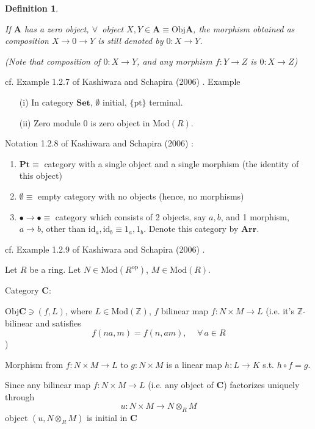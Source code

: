 \documentclass[10pt]{amsart}
\newtheorem{definition}{Definition}
\begin{document}
\begin{multicols*}{2}
\begin{definition}
\begin{enumerate}
		If $\mathbf{A}$ has a zero object, $\forall \, $ object $X, Y \in \mathbf{A} \equiv \text{Obj}\mathbf{A}$, the morphism obtained as composition $X\to 0 \to Y$ is still denoted by $0: X\to Y$.
		
		(Note that composition of $0:X \to Y$, and any morphism $f:Y \to Z$ is $0:X \to Z$)
	\end{enumerate}
\end{definition}

cf. Example 1.2.7 of Kashiwara and Schapira (2006) \cite{KaSch2006}. 
Example 
\begin{enumerate}
	\item[(i)] In category $\mathbf{Set}$, $\emptyset$ initial, $\lbrace \text{pt} \rbrace$ terminal. 
	\item[(ii)] Zero module $0$ is zero object in $\text{Mod}(R)$.
\end{enumerate}

Notation 1.2.8 of Kashiwara and Schapira (2006) \cite{KaSch2006}:
\begin{enumerate}
	\item $\mathbf{Pt} \equiv $ category with a single object and a single morphism (the identity of this object)
	\item $\emptyset \equiv $ empty category with no objects (hence, no morphisms)
	\item $\bullet \to \bullet \equiv$ category which consists of 2 objects, say $a,b$, and 1 morphism, $a\to b$, other than $\text{id}_a, \text{id}_b \equiv 1_a, 1_b$. Denote this category by $\mathbf{Arr}$.  
\end{enumerate}

cf. Example 1.2.9 of Kashiwara and Schapira (2006) \cite{KaSch2006}. 

Let $R$ be a ring. Let $N\in \text{Mod}(R^{\text{op}})$, $M\in \text{Mod}(R)$.

Category $\mathbf{C}$: 

$\text{Obj}\mathbf{C} \ni (f, L)$, where $L\in \text{Mod}(\mathbb{Z})$, $f$ bilinear map $f: N \times M \to L$ (i.e. it's $\mathbb{Z}$-bilinear and satisfies
\[
f(na, m) = f(n,am), \quad \, \forall \, a \in R
\])

Morphism from $f:N \times M \to L$ to $g: N\times M$ is a linear map $h:L\to K$ s.t. $h\circ f =g$. 

Since any bilinear map $f: N\times M \to L$ (i.e. any object of $\mathbf{C}$) factorizes uniquely through
\[
u  : N\times M \to N \otimes_R M
\]
object $(u, N \otimes_R M)$ is initial in $\mathbf{C}$


\end{multicols*}
\end{document}
